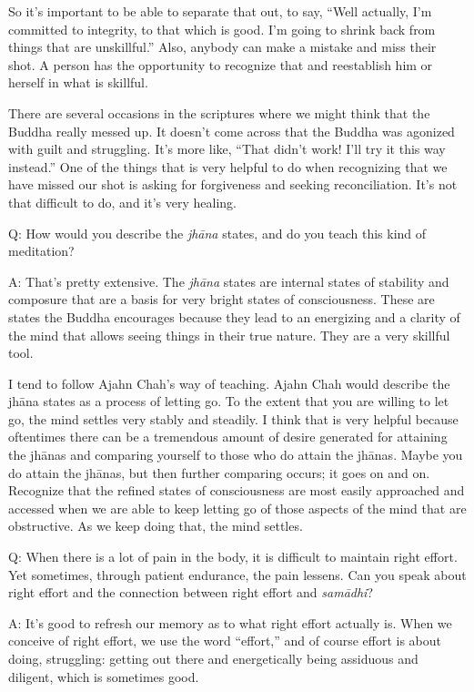 So it’s important to be able to separate that out, to say, “Well
actually, I’m committed to integrity, to that which is good. I’m going
to shrink back from things that are unskillful.” Also, anybody can make
a mistake and miss their shot. A person has the opportunity to recognize
that and reestablish him or herself in what is skillful.

There are several occasions in the scriptures where we might think that
the Buddha really messed up. It doesn’t come across that the Buddha was
agonized with guilt and struggling. It’s more like, “That didn’t work!
I’ll try it this way instead.” One of the things that is very helpful to
do when recognizing that we have missed our shot is asking for
forgiveness and seeking reconciliation. It’s not that difficult to do,
and it’s very healing.

\qaspace
Q: How would you describe the \emph{jhāna} states, and do you teach this
kind of meditation?

\qaspace
A: That’s pretty extensive. The \emph{jhāna} states are internal states
of stability and composure that are a basis for very bright states of
consciousness. These are states the Buddha encourages because they lead
to an energizing and a clarity of the mind that allows seeing things in
their true nature. They are a very skillful tool.

I tend to follow Ajahn Chah’s way of teaching. Ajahn Chah would describe
the jhāna states as a process of letting go. To the extent that you are
willing to let go, the mind settles very stably and steadily. I think
that is very helpful because oftentimes there can be a tremendous amount
of desire generated for attaining the jhānas and comparing yourself to
those who do attain the jhānas. Maybe you do attain the jhānas, but then
further comparing occurs; it goes on and on. Recognize that the refined
states of consciousness are most easily approached and accessed when we
are able to keep letting go of those aspects of the mind that are
obstructive. As we keep doing that, the mind settles.

\qaspace
Q: When there is a lot of pain in the body, it is difficult to maintain
right effort. Yet sometimes, through patient endurance, the pain
lessens. Can you speak about right effort and the connection between
right effort and \emph{samādhi}?

\qaspace
A: It’s good to refresh our memory as to what right effort actually is.
When we conceive of right effort, we use the word “effort,” and of
course effort is about doing, struggling: getting out there and
energetically being assiduous and diligent, which is sometimes good.

